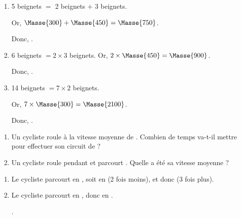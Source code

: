 \begin{Maquette}[Fiche,CorrigeFin,Colonnes=2]{}
\begin{multicols}{2}
      \begin{Solution}
         \begin{enumerate}
            \item 5 beignets $=$ 2 beignets $+$ 3 beignets. \par
               Or, $\Masse{300}+\Masse{450} =\Masse{750}$. \par
               Donc, .
            \item 6 beignets $=2\times3$ beignets.
               Or, $2\times\Masse{450} = \Masse{900}$. \par
               Donc, .
            \item 14 beignets $=7\times2$ beignets. \par
               Or, $7\times\Masse{300} =\Masse{2100}$. \par
               Donc, .
         \end{enumerate}
      \end{Solution}
      
      
      \begin{exercice} %
         \begin{enumerate}
            \item Un cycliste roule à la vitesse moyenne de . Combien de temps va-t-il mettre pour effectuer son circuit de  ?
            \item Un cycliste roule pendant  et parcourt . Quelle a été sa vitesse moyenne ?
         \end{enumerate}
      \end{exercice}
      
      \begin{Solution}
         \begin{enumerate}
            \item Le cycliste parcourt  en , soit  en  (2 fois moins), et donc  (3 fois plus).
            \item Le cycliste parcourt  en , donc  en . \par
               .
         \end{enumerate}
      \end{Solution}



\end{multicols}
\end{Maquette}
